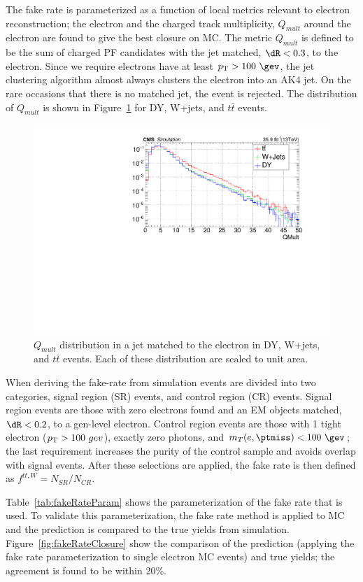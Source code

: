 The fake rate is parameterized as a function of local metrics relevant to electron reconstruction;
the electron \pt and the charged track multiplicity, $Q_{mult}$ around the electron 
are found to give the best closure on MC.  The metric $Q_{mult}$ 
is defined to be the sum of charged PF candidates with the jet 
matched, $\dR<0.3$, to the electron. Since we require electrons have at least
$\pt>100~\gev$, the jet clustering algorithm almost always clusters
the electron into an AK4 jet.  On the rare occasions that there is 
no matched jet, the event is rejected.  The distribution of $Q_{mult}$
is shown in Figure~\ref{fig:qMultDist} for DY, W+jets, and $t\bar{t}$ events. 

\begin{figure}[h!]
\centering
\includegraphics[width=0.48\linewidth]{../Figures/Chap3/fake_rate_closure/QMult_eleJet_ttwDY.pdf}
\caption{$Q_{mult}$ distribution in a jet matched to the electron in 
DY, W+jets, and $t\bar{t}$ events. Each of these distribution are scaled to unit area.}
\label{fig:qMultDist}
\end{figure}

When deriving the fake-rate from simulation events are divided into
two categories, signal region (SR) events, and control region (CR) events.  Signal region events are 
those with zero electrons found and an EM objects matched, $\dR<0.2$, to a gen-level
electron. Control region events are those with 1 tight electron ($p_{\mathrm{T}}>100~gev$), 
exactly zero photons, and $m_T(e,\ptmiss)<100~\gev$; the last requirement 
increases the purity of the control sample and avoids overlap with 
signal events.  After these selections are applied, the fake rate is then
defined as $f^{tt,W}=N_{SR}/N_{CR}$.  

Table~\ref{tab:fakeRateParam} shows the parameterization
of the fake rate that is used.   To validate this parameterization, the
fake rate method is applied to MC and the prediction is compared to the 
true yields from simulation.  Figure~\ref{fig:fakeRateClosure} show the comparison 
of the prediction (applying the fake rate parameterization to single 
electron MC events) and true yields; the agreement is found to be 
within 20\%.
                            


